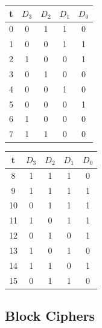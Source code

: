 \begin{center}
\begin{minipage}{0.45\textwidth}
\begin{tabular}{ c | c | c | c | c }
 \label{table:lfsr}
  t & $D_3$ & $D_2$ & $D_1$ & $D_0$ \\ \hline
  0 & 0 & 1 & 1 & 0 \\
  1 & 0& 0& 1& 1\\
  2 & 1&0 &0 &1 \\
  3 & 0& 1& 0& 0\\
  4 & 0&0 &1 &0 \\
  5 & 0&0 &0 &1 \\
  6 & 1&0 &0 &0 \\
  7 & 1&1 &0 &0 \\
  \end{tabular}
\end{minipage}\hfill
\begin{minipage}{0.45\textwidth} 
\begin{tabular}{ c | c | c | c | c }
  t & $D_3$ & $D_2$ & $D_1$ & $D_0$ \\ \hline
  8  & 1& 1& 1& 0\\
  9  & 1& 1& 1& 1\\
  10 & 0& 1& 1& 1\\
  11 & 1& 0& 1& 1\\
  12 & 0& 1& 0& 1\\
  13 & 1& 0& 1& 0\\
  14 & 1& 1& 0& 1\\
  15 & 0& 1& 1& 0\\
\end{tabular}
\end{minipage}
\end{center}

\subsection{Block Ciphers}

